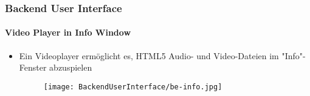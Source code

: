 \begin{frame}[fragile]
	\frametitle{Backend User Interface}
	\framesubtitle{Video Player in Info Window}

	\begin{itemize}
		\item Ein Videoplayer ermöglicht es, HTML5 Audio- und Video-Dateien im "Info"-Fenster abzuspielen

		\begin{figure}
			\texttt{[image: BackendUserInterface/be-info.jpg]}
		\end{figure}

	\end{itemize}

\end{frame}

